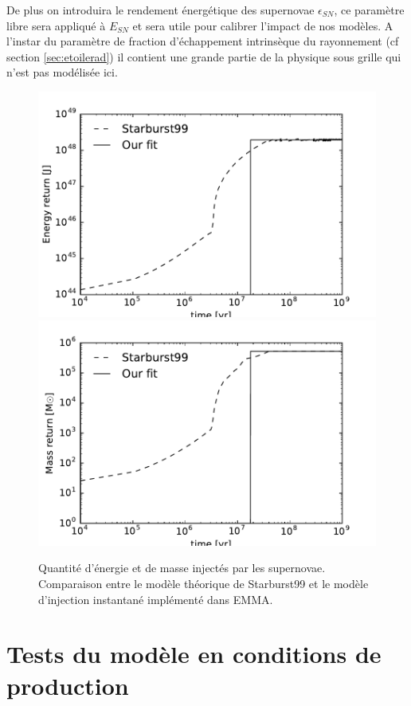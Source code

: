 De plus on introduira le rendement énergétique des supernovae $\epsilon_{SN}$, ce paramètre libre sera appliqué à $E_{SN}$ et sera utile pour calibrer l'impact de nos modèles.
A l'instar du paramètre de fraction d'échappement intrinsèque du rayonnement (cf section \ref{sec:etoilerad}) il contient une grande partie de la physique sous grille qui n'est pas modélisée ici.

\begin{figure}
        \includegraphics[width=.95\textwidth]{img/03/energy_loss.pdf} 
		\includegraphics[width=.95\textwidth]{img/03/mass_loss.pdf} 
        \caption[Calibration des supernovæ]{ Quantité d'énergie et de masse injectés par les supernovae. 
        Comparaison entre le modèle théorique de Starburst99 et le modèle d'injection instantané implémenté dans EMMA.
 		\label{fig:SNloss}}
\end{figure}


\clearpage
\section{Tests du modèle en conditions de production}


